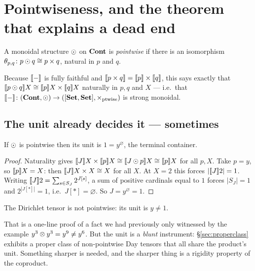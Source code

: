 \section{Pointwiseness, and the theorem that explains a dead end}
\label{sec:pointwise}

\begin{Definition}[Pointwise]\label{def:pointwise}
A monoidal structure $\mathbin{\odot}$ on $\mathbf{Cont}$ is \emph{pointwise} if there is an
isomorphism $\theta_{p,q}\colon p\mathbin{\odot} q\cong p\times q$, natural in $p$ and
$q$.
\end{Definition}

Because $\llbracket - \rrbracket$ is fully faithful and $\llbracket p\times q \rrbracket=\llbracket p \rrbracket\times\llbracket q \rrbracket$,
this says exactly that $\llbracket p\mathbin{\odot} q \rrbracket X\cong\llbracket p \rrbracket X\times\llbracket q \rrbracket X$ naturally in
$p,q$ and $X$ --- i.e.\ that
$\llbracket - \rrbracket\colon(\mathbf{Cont},\mathbin{\odot})\to([\mathbf{Set},\mathbf{Set}],\times_{\text{ptwise}})$ is strong
monoidal.

\subsection{The unit already decides it --- sometimes}

\begin{Proposition}\label{prop:unitinitial}
If $\mathbin{\odot}$ is pointwise then its unit is $1=y^{\varnothing}$, the terminal
container.
\end{Proposition}

\begin{proof}
Naturality gives $\llbracket J \rrbracket X\times\llbracket p \rrbracket X\cong\llbracket J\mathbin{\odot} p \rrbracket X\cong\llbracket p \rrbracket X$ for all
$p, X$. Take $p=y$, so $\llbracket p \rrbracket X=X$: then $\llbracket J \rrbracket X\times X\cong X$ for all $X$.
At $X=2$ this forces $|\llbracket J \rrbracket2|=1$. Writing $\llbracket J \rrbracket2=\sum_{s\in S_J}2^{J[s]}$, a
sum of positive cardinals equal to $1$ forces $|S_J|=1$ and $2^{|J[\ast]|}=1$,
i.e.\ $J[\ast]=\varnothing$. So $J=y^{\varnothing}=1$.
\end{proof}

\begin{Corollary}\label{cor:dirnotptwise}
The Dirichlet tensor is not pointwise: its unit is $y\neq 1$.
\end{Corollary}

That is a one-line proof of a fact we had previously only witnessed by the
example $y^3\mathbin{\otimes} y^3=y^9\neq y^6$. But the unit is a \emph{blunt} instrument:
§\ref{sec:properclass} exhibits a proper class of non-pointwise Day tensors that
all share the product's unit. Something sharper is needed, and the sharper thing
is a rigidity property of the coproduct.

